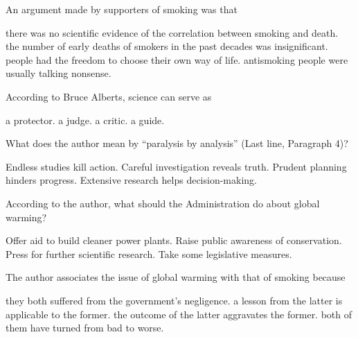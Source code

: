 \item An argument made by supporters of smoking was that
\begin{tasks}
	\task there was no scientific evidence of the correlation between smoking and death.
	\task the number of early deaths of smokers in the past decades was insignificant.
	\task people had the freedom to choose their own way of life.
	\task antismoking people were usually talking nonsense.
\end{tasks}
\item According to Bruce Alberts, science can serve as
\begin{tasks}
	\task a protector.
	\task a judge.
	\task a critic.
	\task a guide.
\end{tasks}
\item What does the author mean by ``paralysis by analysis'' (Last line, Paragraph 4)?
\begin{tasks}
	\task Endless studies kill action.
	\task Careful investigation reveals truth.
	\task Prudent planning hinders progress.
	\task Extensive research helps decision-making.
\end{tasks}
\item According to the author, what should the Administration do about global warming?
\begin{tasks}
	\task Offer aid to build cleaner power plants.
	\task Raise public awareness of conservation.
	\task Press for further scientific research.
	\task Take some legislative measures.
\end{tasks}
\item The author associates the issue of global warming with that of smoking because
\begin{tasks}
	\task they both suffered from the government's negligence.
	\task a lesson from the latter is applicable to the former.
	\task the outcome of the latter aggravates the former.
	\task both of them have turned from bad to worse.
\end{tasks}